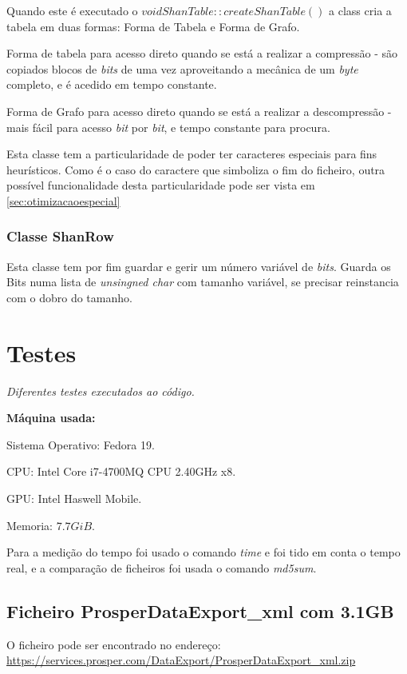 \documentclass[11pt,a4paper]{report}
\begin{document}
Quando este é executado o \textit{$void ShanTable::createShanTable()$} a class cria a tabela em duas formas: Forma de Tabela e Forma de Grafo.

Forma de tabela para acesso direto quando se está a realizar a compressão - são copiados blocos de \textit{bits} de uma vez aproveitando a mecânica de um \textit{byte} completo, e é acedido em tempo constante.

Forma de Grafo para acesso direto quando se está a realizar a descompressão - mais fácil para acesso \textit{bit} por \textit{bit}, e tempo constante para procura.


Esta classe tem a particularidade de poder ter caracteres especiais para fins heurísticos. Como é o caso do caractere que simboliza o fim do ficheiro, outra possível funcionalidade desta particularidade pode ser vista em \ref{sec:otimizacaoespecial}

\subsection{Classe ShanRow}
\label{sec:tabelaShannonRow}
Esta classe tem por fim guardar e gerir um número variável de \textit{bits}.
Guarda os Bits numa lista de \textit{unsingned char} com tamanho variável, se precisar reinstancia com o dobro do tamanho.



\newpage
\chapter{Testes}
\centerline{\textit{Diferentes testes executados ao código.}}

\vspace{6cm}
\textbf{Máquina usada:}

Sistema Operativo: Fedora 19.

CPU: Intel Core i7-4700MQ CPU 2.40GHz x8.

GPU: Intel Haswell Mobile.

Memoria: $7.7 GiB$.

Para a medição do tempo foi usado o comando \textit{time} e foi tido em conta o tempo real, e a comparação de ficheiros foi usada o comando \textit{md5sum}.

\newpage
\section{Ficheiro ProsperDataExport\_xml com 3.1GB}
O ficheiro pode ser encontrado no endereço:\\ \url{https://services.prosper.com/DataExport/ProsperDataExport_xml.zip}
\end{document}
